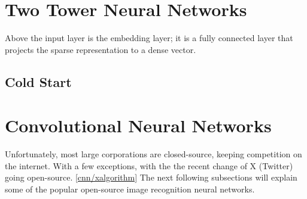 \section{Two Tower Neural Networks} \label{nn}

Above the input layer is the embedding layer; it is a fully
connected layer that projects the sparse representation to
a dense vector.  \cite{10.1145/3038912.3052569}

\subsection{Cold Start}\label{cold-start}

\begin{comment}
\noindent\rule{2cm}{0.4pt}

aTwo tower neural network architecture 
User embedding
Post embedding
embedding = vector
normalize vector
dot product of post and user vector
pre trained embeddings

\noindent\rule{2cm}{0.4pt}
\end{comment}

\section{Convolutional Neural Networks}

Unfortunately, most large corporations are closed-source, keeping competition on the internet. With a few exceptions, with the the recent change of X (Twitter) going open-source. \ref{cnn/xalgorithm} The next following subsections will explain some of the popular open-source image recognition neural networks.

\begin{comment}








\end{comment}